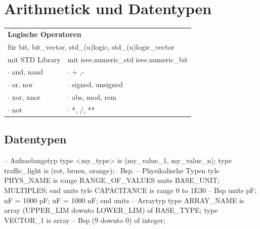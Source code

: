 \section{Arithmetick und Datentypen}

\begin{minipage}{0.4\textwidth}
	\begin{tabular}{l|l}
		\multicolumn{2}{l}{\textbf{Logische Operatoren}}  \\
		\multicolumn{2}{l}{für bit, bit\_vector, std\_(u)logic, std\_(u)logic\_vector }\\
		mit STD Library		& mit ieee.numeric\_std {\tiny ieee.numeric\_bit}\\
		\hline
		$\cdot$ and, nand	& $\cdot$ + ,-\\
		$\cdot$ or, nor		& $\cdot$ signed, unsigned \\
		$\cdot$ xor, xnor	& $\cdot$ abs, mod, rem\\
		$\cdot$ not			& $\cdot$ *, /, **\\
	\end{tabular}
	
	\subsection{Datentypen}
	
	\begin{VHDL}
-- Aufzaelungstyp
type <my_type> is ({my_value_1,} my_value_n);
type traffic_light is (rot, bruen, orange);-- Bsp.
-- Physikalische Typen
tyle PHYS_NAME is range RANGE_OF_VALUES
units
	BASE_UNIT;
	{MULTIPLES;}
end units
tyle CAPACITANCE is range 0 to 1E30 -- Bsp
units
	pF;
	nF = 1000 pF;
	uF = 1000 nF;
end units
-- Arraytyp
type ARRAY_NAME is array
	(UPPER_LIM downto LOWER_LIM) of BASE_TYPE;
type VECTOR_1 is array  -- Bsp
	(9 downto 0) of integer;
	\end{VHDL}
	
\end{minipage}
